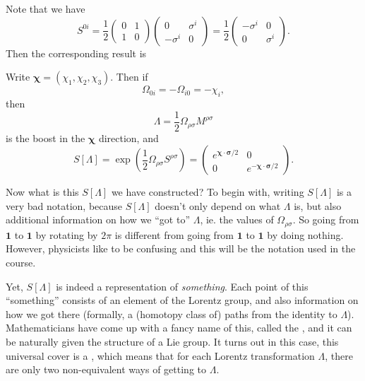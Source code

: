 \documentclass[a4paper]{article}
\begin{document}
Note that we have
\[
  S^{0i} = \frac{1}{2}
  \begin{pmatrix}
    0 & 1\\
    1 & 0
  \end{pmatrix}
  \begin{pmatrix}
    0 & \sigma^i\\
    -\sigma^i & 0
  \end{pmatrix}=
  \frac{1}{2}
  \begin{pmatrix}
    -\sigma^i & 0\\
    0 & \sigma^i
  \end{pmatrix}.
\]
Then the corresponding result is
\begin{prop}
  Write $\boldsymbol\chi = (\chi_1, \chi_2, \chi_3)$. Then if
  \[
    \Omega_{0i} = -\Omega_{i0} = -\chi_i,
  \]
  then
  \[
    \Lambda = \frac{1}{2} \Omega_{\rho\sigma}M^{\rho\sigma}
  \]
  is the boost in the $\boldsymbol\chi$ direction, and
  \[
    S[\Lambda] = \exp\left(\frac{1}{2} \Omega_{\rho\sigma} S^{\rho \sigma}\right) =
    \begin{pmatrix}
      e^{\boldsymbol\chi \cdot \boldsymbol\sigma/2} & 0\\
      0 & e^{-\boldsymbol\chi \cdot \boldsymbol\sigma/2}
    \end{pmatrix}.
  \]
\end{prop}

Now what is this $S[\Lambda]$ we have constructed? To begin with, writing $S[\Lambda]$ is a very bad notation, because $S[\Lambda]$ doesn't only depend on what $\Lambda$ is, but also additional information on how we ``got to'' $\Lambda$, ie. the values of $\Omega_{\rho\sigma}$. So going from $\mathbf{1}$ to $\mathbf{1}$ by rotating by $2\pi$ is different from going from $\mathbf{1}$ to $\mathbf{1}$ by doing nothing. However, physicists like to be confusing and this will be the notation used in the course.

Yet, $S[\Lambda]$ is indeed a representation of \emph{something}. Each point of this ``something'' consists of an element of the Lorentz group, and also information on how we got there (formally, a (homotopy class of) paths from the identity to $\Lambda$). Mathematicians have come up with a fancy name of this, called the , and it can be naturally given the structure of a Lie group. It turns out in this case, this universal cover is a , which means that for each Lorentz transformation $\Lambda$, there are only two non-equivalent ways of getting to $\Lambda$.
\end{document}
